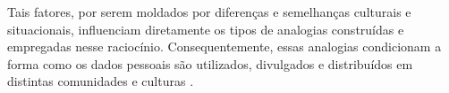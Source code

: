 \documentclass[
	12pt,				%
	oneside,			%
	a4paper,			%
	english,			%
	brazil				%
	]{abntex2ppgsi}
\begin{document}
  Tais fatores, por serem moldados por diferenças e semelhanças culturais e situacionais, influenciam diretamente os tipos de analogias construídas e empregadas nesse raciocínio. Consequentemente, essas analogias condicionam a forma como os dados pessoais são utilizados, divulgados e distribuídos em distintas comunidades e culturas \cite{Victorelli2020Human, VICTORELLI2020Understanding}.


  
\end{document}
